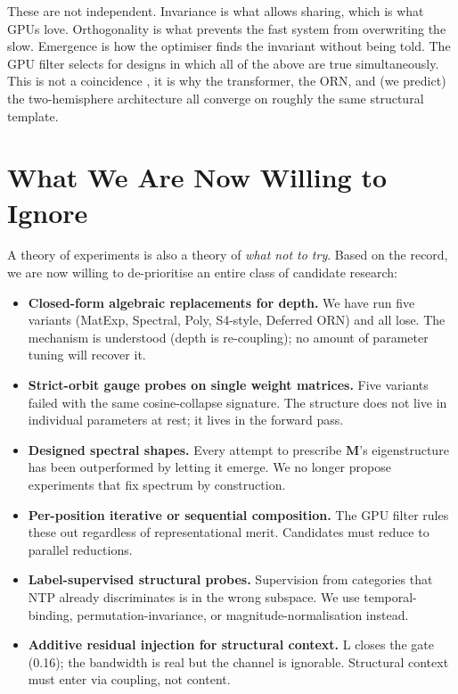 \documentclass[11pt, a4paper]{article}
\newcommand{\M}{\mathbf{M}}
\begin{document}
These are not independent. Invariance is what allows sharing, which is what GPUs love. Orthogonality is what prevents the fast system from overwriting the slow. Emergence is how the optimiser finds the invariant without being told. The GPU filter selects for designs in which all of the above are true simultaneously. This is not a coincidence ,  it is why the transformer, the ORN, and (we predict) the two-hemisphere architecture all converge on roughly the same structural template.

\section{What We Are Now Willing to Ignore}

A theory of experiments is also a theory of \emph{what not to try}. Based on the record, we are now willing to de-prioritise an entire class of candidate research:

\begin{itemize}[nosep]
\item \textbf{Closed-form algebraic replacements for depth.} We have run five variants (MatExp, Spectral, Poly, S4-style, Deferred ORN) and all lose. The mechanism is understood (depth is re-coupling); no amount of parameter tuning will recover it.
\item \textbf{Strict-orbit gauge probes on single weight matrices.} Five variants failed with the same cosine-collapse signature. The structure does not live in individual parameters at rest; it lives in the forward pass.
\item \textbf{Designed spectral shapes.} Every attempt to prescribe $\M$'s eigenstructure has been outperformed by letting it emerge. We no longer propose experiments that fix spectrum by construction.
\item \textbf{Per-position iterative or sequential composition.} The GPU filter rules these out regardless of representational merit. Candidates must reduce to parallel reductions.
\item \textbf{Label-supervised structural probes.} Supervision from categories that NTP already discriminates is in the wrong subspace. We use temporal-binding, permutation-invariance, or magnitude-normalisation instead.
\item \textbf{Additive residual injection for structural context.} L closes the gate (0.16); the bandwidth is real but the channel is ignorable. Structural context must enter via coupling, not content.
\end{itemize}
\end{document}
